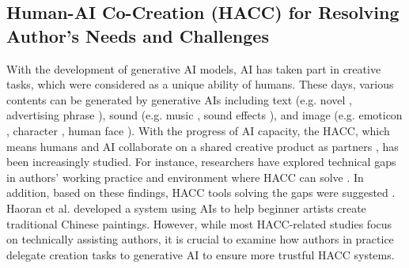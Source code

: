 \subsection{Human-AI Co-Creation (HACC) for Resolving Author’s Needs and Challenges}
With the development of generative AI models, AI has taken part in creative tasks, which were considered as a unique ability of humans. These days, various contents can be generated by generative AIs including text (e.g. novel \cite{yuan2022wordcraft}, advertising phrase \cite{saputra2023impact}), sound (e.g. music \cite{wang2022cps}, sound effects \cite{kang2023fall}), and image (e.g. emoticon \cite{yang2021icon}, character \cite{ruan2022anime}, human face \cite{jadhav2023high}). With the progress of AI capacity, the HACC, which means humans and AI collaborate on a shared creative product as partners \cite{rezwana2022designing}, has been increasingly studied.
For instance, researchers have explored technical gaps in authors' working practice and environment where HACC can solve \cite{inie2023designing,ko2023large,wan2023it}. %
In addition, based on these findings, HACC tools solving the gaps were suggested \cite{haoran2023magical,wang2023popblends,liu2022opal,ippolito2022creative,dang2022beyond}. Haoran et al. \cite{haoran2023magical} developed a system using AIs to help beginner artists create traditional Chinese paintings.
However, while most HACC-related studies focus on technically assisting authors, it is crucial to examine how authors in practice delegate creation tasks to generative AI to ensure more trustful HACC systems.